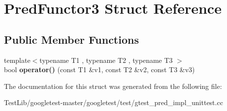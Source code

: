 \hypertarget{structPredFunctor3}{}\section{Pred\+Functor3 Struct Reference}
\label{structPredFunctor3}
\subsection*{Public Member Functions}
\begin{DoxyCompactItemize}
\item 
\mbox{\label{structPredFunctor3_a08b0c59189570fb8eb7e2c7452fec995}} 
{\footnotesize template$<$typename T1 , typename T2 , typename T3 $>$ }\\bool {\bfseries operator()} (const T1 \&v1, const T2 \&v2, const T3 \&v3)
\end{DoxyCompactItemize}


The documentation for this struct was generated from the following file\+:\begin{DoxyCompactItemize}
\item 
Test\+Lib/googletest-\/master/googletest/test/gtest\+\_\+pred\+\_\+impl\+\_\+unittest.\+cc\end{DoxyCompactItemize}
